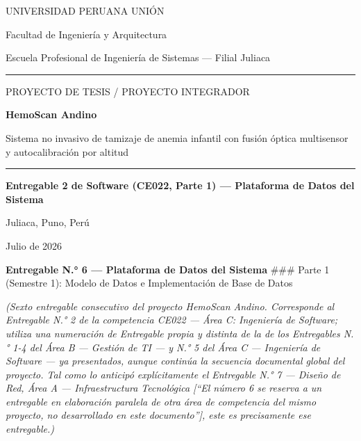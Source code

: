 \documentclass[11pt,a4paper]{article}
\begin{document}
\begin{titlepage}
\centering
\vspace*{1.2cm}
{\large UNIVERSIDAD PERUANA UNI\'ON\par}
{\normalsize Facultad de Ingenier\'ia y Arquitectura\par}
{\normalsize Escuela Profesional de Ingenier\'ia de Sistemas --- Filial Juliaca\par}
\vspace{0.5cm}
\rule{0.6\linewidth}{0.4pt}
\vspace{1.6cm}

{\large PROYECTO DE TESIS / PROYECTO INTEGRADOR\par}
\vspace{1.0cm}
{\huge\bfseries HemoScan Andino\par}
\vspace{0.6cm}
{\Large Sistema no invasivo de tamizaje de anemia infantil con fusi\'on \'optica multisensor y autocalibraci\'on por altitud\par}
\vspace{1.6cm}
\rule{0.6\linewidth}{0.4pt}
\vspace{1.6cm}

{\Large\bfseries Entregable 2 de Software (CE022, Parte 1) --- Plataforma de Datos del Sistema\par}
\vspace{2.0cm}

{\normalsize Juliaca, Puno, Per\'u \par}
{\normalsize Julio de 2026\par}

\vfill
\end{titlepage}

\tableofcontents
\newpage

\textbf{Entregable N.° 6 --- Plataforma de Datos del Sistema}
\#\#\# Parte 1 (Semestre 1): Modelo de Datos e Implementación de Base de Datos

\emph{(Sexto entregable consecutivo del proyecto HemoScan Andino. Corresponde al Entregable N.° 2 de la competencia CE022 --- Área C: Ingeniería de Software; utiliza una numeración de Entregable propia y distinta de la de los Entregables N.° 1-4 del Área B --- Gestión de TI --- y N.° 5 del Área C --- Ingeniería de Software --- ya presentados, aunque continúa la secuencia documental global del proyecto. Tal como lo anticipó explícitamente el Entregable N.° 7 --- Diseño de Red, Área A --- Infraestructura Tecnológica {[}``El número 6 se reserva a un entregable en elaboración paralela de otra área de competencia del mismo proyecto, no desarrollado en este documento''{]}, este es precisamente ese entregable.)}
\end{document}
